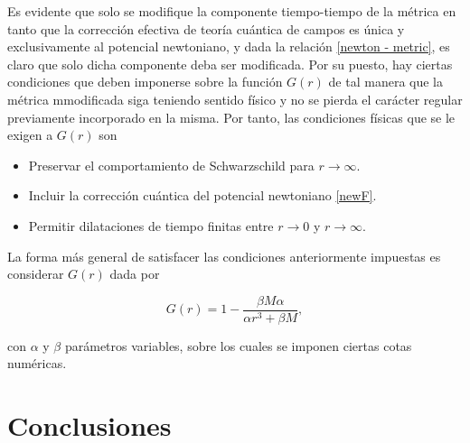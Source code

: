 \documentclass{article}
\numberwithin{equation}{section}
\theoremstyle{definition}
\begin{document}
Es evidente que solo se modifique la componente tiempo-tiempo de la métrica en tanto que la corrección efectiva de teoría cuántica de campos es única y exclusivamente al  potencial newtoniano, y dada la relación \eqref{newton - metric}, es claro que solo dicha componente deba ser modificada. Por su puesto, hay ciertas condiciones que deben imponerse sobre la función $G(r)$ de tal manera que la métrica mmodificada siga teniendo sentido físico y no se pierda el carácter regular previamente incorporado en la misma. Por tanto, las condiciones físicas que se le exigen a $G(r)$ son
\begin{itemize}
\item Preservar el comportamiento de Schwarzschild para $r \to \infty$.
\item Incluir la corrección cuántica del potencial newtoniano \eqref{newF}.
\item Permitir dilataciones de tiempo finitas entre $r \to 0$ y $r \to \infty$.
\end{itemize}

La forma más general de satisfacer las condiciones anteriormente impuestas es considerar $G(r)$ dada por

\begin{equation}
\label{mod-hay-g}
G(r) = 1 - \frac{\beta M \alpha}{\alpha r^3 + \beta M},
\end{equation}

con $\alpha$ y $\beta$ parámetros variables, sobre los cuales se imponen ciertas cotas numéricas.


\section{\label{conclusions} Conclusiones}


\newpage
\nocite{*}


\end{document}
